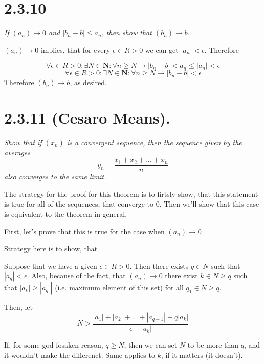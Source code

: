 \documentclass[11pt,oneside,titlepage]{article}
\begin{document}
\section*{2.3.10}
\textit{If $(a_n) \to 0$ and $|b_n - b| \leq a_n$, then show that $(b_n) \to b$.}

$(a_n) \to 0$ implies, that for every $\epsilon \in R > 0$ we can get
$|a_n| < \epsilon$. Therefore

$$\forall \epsilon \in R > 0: \exists N \in \textbf{N}: \forall n \geq N \to
|b_n - b| < a_n \leq |a_n| < \epsilon$$
$$\forall \epsilon \in R > 0: \exists N \in \textbf{N}: \forall n \geq N \to
|b_n - b|  < \epsilon$$
Therefore $(b_n) \to b$, as desired.

\section*{2.3.11 (Cesaro Means).}
\textit{Show that if $(x_n)$ is a convergent sequence, then the sequence given by
  the averages }
$$y_n = \frac{x_1 + x_2 + ... + x_n}{n}$$
\textit{also converges to the same limit.}

The strategy for the proof for this theorem  is to firtsly show, that this
statement is true for all of the sequences, that converge to
0. Then we'll show that this case is equivalent to the theorem in general.

First, let's prove that this is true for the case when  $(a_n) \to 0$

Strategy here is to show, that 

Suppose that we have a given $\epsilon \in R > 0$. Then there exists
$q \in N$ such that  $|a_q| < \epsilon$. Also, because of the fact,
that $(a_n) \to 0$ there exist  $ k \in N \geq q$
such that $|a_k| \geq |a_{q_1}|$ (i.e. maximum element of this set)
for all $q_1 \in N \geq q$.

Then, let
$$ N > \frac{|a_1| + |a_2| +  ... + |a_{q - 1}| - q|a_k|}{\epsilon -   |a_k|}$$

If, for some god fosaken reason, $q \geq N$, then we can set $N$ to be more
than $q$, and it wouldn't make the differenct. Same applies to $k$, if it
matters (it doesn't).
\end{document}

